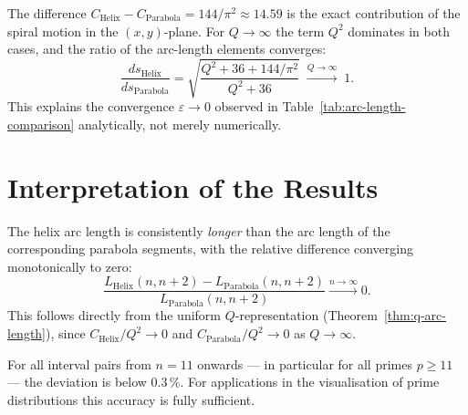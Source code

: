 \begin{remark}\label{rem:geometric-meaning-Q}
The difference $C_{\mathrm{Helix}} - C_{\mathrm{Parabola}} = 144/\pi^2
\approx 14.59$ is the exact contribution of the spiral motion in the
$(x,y)$-plane. For $Q \to \infty$ the term $Q^2$ dominates in both
cases, and the ratio of the arc-length elements converges:
\[
  \frac{ds_{\mathrm{Helix}}}{ds_{\mathrm{Parabola}}}
  = \sqrt{\frac{Q^2 + 36 + 144/\pi^2}{Q^2 + 36}}
  \;\xrightarrow{Q\to\infty}\; 1.
\]
This explains the convergence $\varepsilon \to 0$ observed in
Table~\ref{tab:arc-length-comparison} analytically, not merely
numerically.
\end{remark}

\section{Interpretation of the Results}

\begin{proposition}
\label{prop:arc-length-convergence}
The helix arc length is consistently \emph{longer} than the arc length
of the corresponding parabola segments, with the relative difference
converging monotonically to zero:
\[
\frac{L_{\mathrm{Helix}}(n, n+2) - L_{\mathrm{Parabola}}(n, n+2)}
{L_{\mathrm{Parabola}}(n, n+2)}
\xrightarrow{n \to \infty} 0.
\]
This follows directly from the uniform $Q$-representation
(Theorem~\ref{thm:q-arc-length}), since
$C_{\mathrm{Helix}}/Q^2 \to 0$ and
$C_{\mathrm{Parabola}}/Q^2 \to 0$ as $Q \to \infty$.
\end{proposition}

\begin{corollary}\label{cor:practical-accuracy}
For all interval pairs from $n = 11$ onwards --- in particular for all
primes $p \geq 11$ --- the deviation is below $0.3\,\%$. For
applications in the visualisation of prime distributions this accuracy
is fully sufficient.
\end{corollary}

